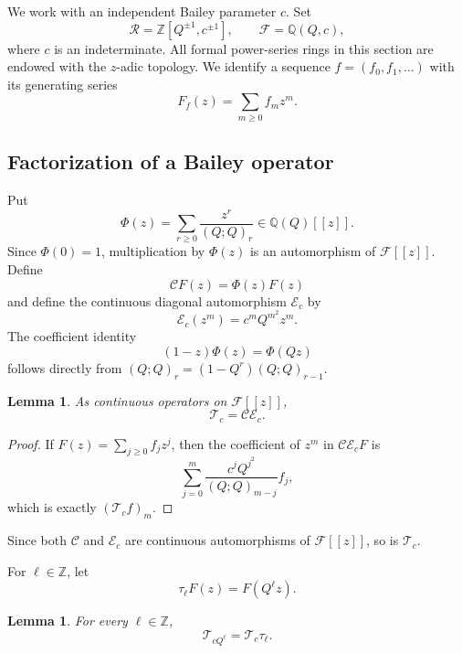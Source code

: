 \documentclass[11pt]{amsart}
\newtheorem{lemma}[theorem]{Lemma}
\newcommand{\Z}{\mathbb Z}
\newcommand{\Q}{\mathbb Q}
\begin{document}
We work with an independent Bailey parameter \(c\).  Set
\[
\mathscr R=\Z[Q^{\pm1},c^{\pm1}],
\qquad
\mathscr F=\Q(Q,c),
\]
where \(c\) is an indeterminate.
All formal power-series rings in this section are endowed with the \(z\)-adic topology.  
We identify a sequence \(f=(f_0,f_1,\ldots)\) with its generating series
\[
F_f(z)=\sum_{m\geq0}f_mz^m.
\]


\subsection{Factorization of a Bailey operator}

Put
\begin{equation}\label{eq:Phi-def}
\Phi(z)
=
\sum_{r\geq0}\frac{z^r}{(Q;Q)_r}
\in\Q(Q)[[z]].
\end{equation}
Since \(\Phi(0)=1\), multiplication by \(\Phi(z)\) is an automorphism
of \(\mathscr F[[z]]\).  Define
\[
\mathcal C F(z)=\Phi(z)F(z)
\]
and define the continuous diagonal automorphism \(\mathcal E_c\) by
\begin{equation}\label{eq:Ec-operator}
\mathcal E_c(z^m)=c^mQ^{m^2}z^m.
\end{equation}
The coefficient identity
\begin{equation}\label{eq:Phi-functional}
(1-z)\Phi(z)=\Phi(Qz)
\end{equation}
follows directly from
\((Q;Q)_r=(1-Q^r)(Q;Q)_{r-1}\).

\begin{lemma}\label{lem:T-factorization-general}
As continuous operators on \(\mathscr F[[z]]\),
\begin{equation}\label{eq:T-factorization-general}
\mathcal T_c=\mathcal C\mathcal E_c.
\end{equation}
\end{lemma}

\begin{proof}
If \(F(z)=\sum_{j\geq0}f_jz^j\), then the coefficient of \(z^m\) in
\(\mathcal C\mathcal E_cF\) is
\[
\sum_{j=0}^{m}
\frac{c^jQ^{j^2}}{(Q;Q)_{m-j}}f_j,
\]
which is exactly \((\mathcal T_cf)_m\).
\end{proof}
Since both \(\mathcal C\) and \(\mathcal E_c\) are continuous
automorphisms of \(\mathscr F[[z]]\), so is \(\mathcal T_c\).

For \(\ell\in\Z\), let
\[
\tau_\ell F(z)=F(Q^\ell z).
\]

\begin{lemma}\label{lem:T-shift-general}
For every \(\ell\in\Z\),
\begin{equation}\label{eq:T-shift-general}
\mathcal T_{cQ^\ell}=\mathcal T_c\tau_\ell.
\end{equation}
\end{lemma}
\end{document}
